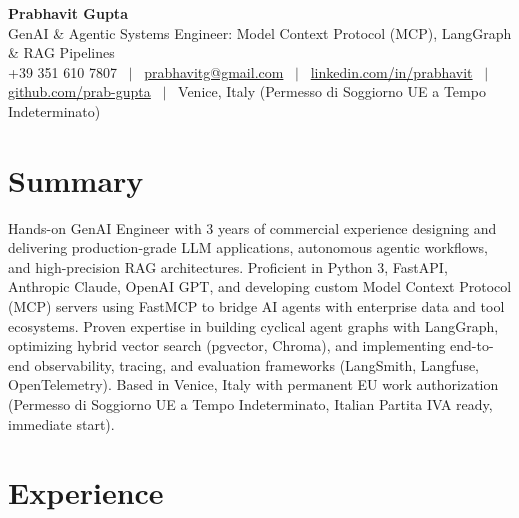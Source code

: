 \documentclass[a4paper,10pt]{article}
\begin{document}
\begin{minipage}[c]{0.80\textwidth}
  {\Huge\bfseries Prabhavit Gupta}\\[3pt]
  {\color{accent}\large GenAI \& Agentic Systems Engineer: Model Context Protocol (MCP), LangGraph \& RAG Pipelines}\\[6pt]
  {\footnotesize +39 351 610 7807 ~$\vert$~
  \href{mailto:prabhavitg@gmail.com}{prabhavitg@gmail.com} ~$\vert$~
  \href{https://www.linkedin.com/in/prabhavit/}{linkedin.com/in/prabhavit} ~$\vert$~
  \href{https://github.com/prab-gupta}{github.com/prab-gupta} ~$\vert$~
  Venice, Italy (Permesso di Soggiorno UE a Tempo Indeterminato)}
\end{minipage}\hfill

\section{Summary}
Hands-on GenAI Engineer with 3 years of commercial experience designing and delivering production-grade LLM applications, autonomous agentic workflows, and high-precision RAG architectures. Proficient in Python 3, FastAPI, Anthropic Claude, OpenAI GPT, and developing custom Model Context Protocol (MCP) servers using FastMCP to bridge AI agents with enterprise data and tool ecosystems. Proven expertise in building cyclical agent graphs with LangGraph, optimizing hybrid vector search (pgvector, Chroma), and implementing end-to-end observability, tracing, and evaluation frameworks (LangSmith, Langfuse, OpenTelemetry). Based in Venice, Italy with permanent EU work authorization (Permesso di Soggiorno UE a Tempo Indeterminato, Italian Partita IVA ready, immediate start).

\section{Experience}
\end{document}
